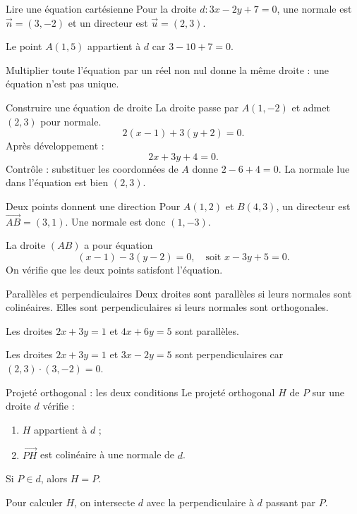 \documentclass[aspectratio=169,12pt]{beamer}
\begin{document}
\renewcommand{\slidekind}{MÉTHODE \& EXEMPLE}
\begin{frame}[t,fragile]{Lire une équation cartésienne}
Pour la droite $d:3x-2y+7=0$, une normale est $\vec n=(3,-2)$ et un directeur est $\vec u=(2,3)$.\medskip\par Le point $A(1,5)$ appartient à $d$ car $3-10+7=0$.\medskip\par Multiplier toute l’équation par un réel non nul donne la même droite : une équation n’est pas unique.
\end{frame}
\renewcommand{\slidekind}{MÉTHODE \& EXEMPLE}
\begin{frame}[t,fragile]{Construire une équation de droite}
La droite passe par $A(1,-2)$ et admet $(2,3)$ pour normale.\[2(x-1)+3(y+2)=0.\]Après développement :\[\boxed{2x+3y+4=0}.\]Contrôle : substituer les coordonnées de $A$ donne $2-6+4=0$. La normale lue dans l’équation est bien $(2,3)$.
\end{frame}
\renewcommand{\slidekind}{COMPRENDRE}
\begin{frame}[t,fragile]{Deux points donnent une direction}
Pour $A(1,2)$ et $B(4,3)$, un directeur est $\overrightarrow{AB}=(3,1)$. Une normale est donc $(1,-3)$.\medskip\par La droite $(AB)$ a pour équation\[(x-1)-3(y-2)=0,\quad\text{soit }x-3y+5=0.\]On vérifie que les deux points satisfont l’équation.
\end{frame}
\renewcommand{\slidekind}{COMPRENDRE}
\begin{frame}[t,fragile]{Parallèles et perpendiculaires}
Deux droites sont parallèles si leurs normales sont colinéaires. Elles sont perpendiculaires si leurs normales sont orthogonales.\medskip\par Les droites $2x+3y=1$ et $4x+6y=5$ sont parallèles.\medskip\par Les droites $2x+3y=1$ et $3x-2y=5$ sont perpendiculaires car $(2,3)\cdot(3,-2)=0$.
\end{frame}
\renewcommand{\slidekind}{COMPRENDRE}
\begin{frame}[t,fragile]{Projeté orthogonal : les deux conditions}
Le projeté orthogonal $H$ de $P$ sur une droite $d$ vérifie :\begin{enumerate}\item $H$ appartient à $d$ ;\item $\overrightarrow{PH}$ est colinéaire à une normale de $d$.\end{enumerate}Si $P\in d$, alors $H=P$.\medskip\par Pour calculer $H$, on intersecte $d$ avec la perpendiculaire à $d$ passant par $P$.
\end{frame}
\end{document}
